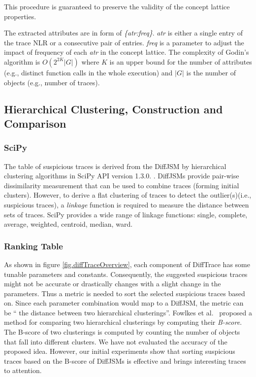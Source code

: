 %
This procedure is guaranteed to preserve the validity of the concept lattice properties.
%

The extracted attributes are in form of \textit{\{atr:freq\}}. 
%
\textit{atr} is either a single entry of the trace NLR or a consecutive pair of entries. \textit{freq} is a parameter to adjust the impact of frequency of each \textit{atr} in the concept lattice.
%
The complexity of Godin's algorithm is $O(2^{2K}|G|)$ where $K$ is an upper bound for the number of attributes (e.g., distinct function calls in the whole execution) and $|G|$ is the number of objects (e.g., number of traces).




\subsection{Hierarchical Clustering, Construction and Comparison}
 \label{subsec:algo-bscore}
 
\subsubsection{SciPy}
The table of suspicious traces is derived from the DiffJSM by hierarchical clustering algorithms in SciPy API version 1.3.0. \cite{scipy}.
%
DiffJSMs provide pair-wise dissimilarity measurement that can be used to combine traces (forming initial clusters).
%
However, to derive a flat clustering of traces to detect the outlier(s)(i.e., suspicious traces), a \textit{linkage} function is required to measure the distance between sets of traces.
%
SciPy provides a wide range of linkage functions: single, complete, average, weighted, centroid, median, ward.

\subsubsection{Ranking Table}
As shown in figure \ref{fig.diffTraceOverview}, each component of DiffTrace has some tunable parameters and constants.
%
Consequently, the suggested suspicious traces might not be accurate or drastically changes with a slight change in the parameters.
%
Thus a metric is needed to sort the selected suspicious traces based on.
%
Since each parameter combination would map to a DiffJSM, the metric can be `` the distance between two hierarchical clusterings''.
%
Fowlkes et al.~\cite{fowlkes83} proposed a method for comparing two hierarchical clusterings by computing their \textit{B-score}.
%
The B-score of two clusterings is computed by counting the number of objects that fall into different clusters.
%
We have not evaluated the accuracy of the proposed idea.
%
However, our initial experiments show that sorting suspicious traces based on the B-score of DiffJSMs is effective and brings interesting traces to attention.

